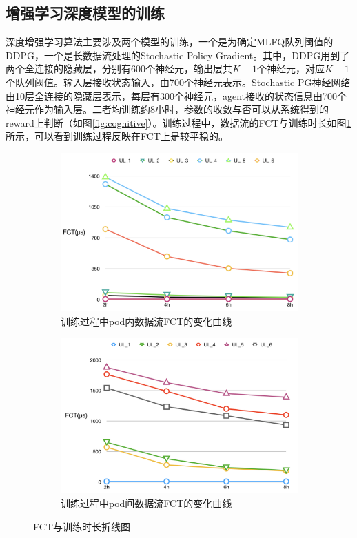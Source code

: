 \subsection{增强学习深度模型的训练}

深度增强学习算法主要涉及两个模型的训练，一个是为确定MLFQ队列阈值的DDPG，一个是长数据流处理的Stochastic Policy Gradient。其中，DDPG用到了两个全连接的隐藏层，分别有600个神经元，输出层共$K-1$个神经元，对应$K-1$个队列阈值。输入层接收状态输入，由700个神经元表示。Stochastic PG神经网络由10层全连接的隐藏层表示，每层有300个神经元，agent接收的状态信息由700个神经元作为输入层。二者均训练约8小时，参数的收敛与否可以从系统得到的reward上判断（如图\ref{fig:cognitive}）。训练过程中，数据流的FCT与训练时长如图\ref{fig:trainingprocess}所示，可以看到训练过程反映在FCT上是较平稳的。


\begin{figure}[htb!]
\centering
\begin{subfigure}{0.47\textwidth}
     \includegraphics[width=\textwidth]{figure/train_8h.png}
     \caption{训练过程中pod内数据流FCT的变化曲线}
\end{subfigure}\hspace{2em}
\begin{subfigure}{0.47\textwidth}
    \includegraphics[width=\textwidth]{figure/train_8h1.png}
     \caption{训练过程中pod间数据流FCT的变化曲线}
\end{subfigure}%
\caption{FCT与训练时长折线图}
\label{fig:trainingprocess}
\end{figure}

